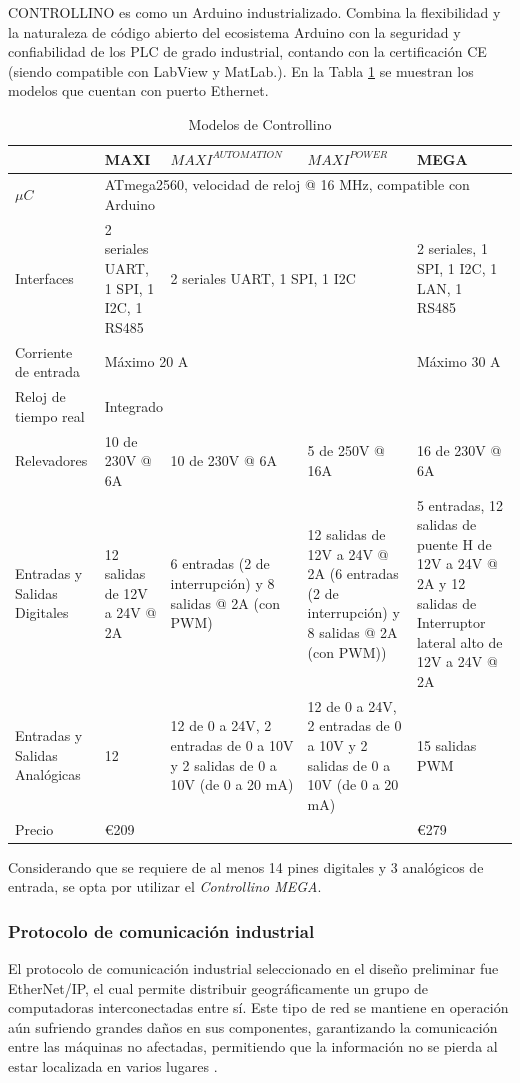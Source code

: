 CONTROLLINO \cite{DDC7} es como un Arduino industrializado. Combina la flexibilidad y la naturaleza de código abierto del ecosistema Arduino con la seguridad y confiabilidad de los PLC de grado industrial, contando con la certificación CE (siendo compatible con LabView y MatLab.). En la Tabla \ref{tab:controllino} se muestran los modelos que cuentan con puerto Ethernet.
\begin{table}[H]
	\centering
	\caption{Modelos de Controllino}
	\begin{tabular}{@{}|p{2cm}|p{2.5cm}|p{3.5cm}|p{2.5cm}|p{2.5cm}|}
		\hline
		& MAXI & $MAXI^{AUTOMATION}$ & $MAXI^{POWER}$ & MEGA \\
		\hline
		$ \mu C $ & \multicolumn{4}{l|}{ATmega2560, velocidad de reloj @ 16 MHz, compatible con Arduino} \\
		\hline
		Interfaces & 2 seriales UART, 1 SPI, 1 I2C, 1 RS485 & \multicolumn{2}{l|}{2 seriales UART, 1 SPI, 1 I2C} & 2 seriales, 1 SPI, 1 I2C, 1 LAN, 1 RS485 \\
		\hline
		Corriente de entrada & \multicolumn{3}{l|}{Máximo 20 A} & Máximo 30 A \\
		\hline
		Reloj de tiempo real & \multicolumn{4}{l|}{Integrado} \\
		\hline
		Relevadores & 10 de 230V @ 6A & 10 de 230V @ 6A & 5 de 250V @ 16A & 16 de 230V @ 6A \\
		\hline
		Entradas y Salidas Digitales & 12 salidas de 12V a 24V @ 2A & 6 entradas (2 de interrupción) y 8 salidas @ 2A (con PWM) & 12 salidas de 12V a 24V @ 2A (6 entradas (2 de interrupción) y 8 salidas @ 2A (con PWM)) & 5 entradas, 12 salidas de puente H de 12V a 24V @ 2A y 12 salidas de Interruptor lateral alto de 12V a 24V @ 2A \\
		\hline
		Entradas y Salidas Analógicas & 12 & 12 de 0 a 24V, 2 entradas de 0 a 10V y 2 salidas de 0 a 10V (de 0 a 20 mA) & 12 de 0 a 24V, 2 entradas de 0 a 10V y 2 salidas de 0 a 10V (de 0 a 20 mA) & 15 salidas PWM \\
		\hline
		Precio & \multicolumn{3}{l|}{\euro209} & \euro279 \\
		\hline
	\end{tabular}%
	\label{tab:controllino}%
\end{table}%
Considerando que se requiere de al menos 14 pines digitales y 3 analógicos de entrada, se opta por utilizar el \textit{Controllino MEGA}.

\subsubsection{Protocolo de comunicación industrial}
El protocolo de comunicación industrial seleccionado en el diseño preliminar fue EtherNet/IP, el cual permite distribuir geográficamente un grupo de computadoras interconectadas entre sí. Este tipo de red se mantiene en operación aún sufriendo grandes daños en sus componentes, garantizando la comunicación entre las máquinas no afectadas, permitiendo que la información no se pierda al estar localizada en varios lugares \cite{DC5}.\\

